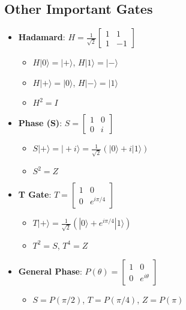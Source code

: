 \begin{multicols}{3}
    \section*{Other Important Gates}
    \begin{itemize}[leftmargin=*,nosep,topsep=0pt]
      \item \textbf{Hadamard}: $H = \frac{1}{\sqrt{2}}\begin{bmatrix} 1 & 1 \\ 1 & -1 \end{bmatrix}$
        \begin{itemize}[nosep]
          \item $H|0\rangle = |+\rangle$, $H|1\rangle = |-\rangle$
          \item $H|+\rangle = |0\rangle$, $H|-\rangle = |1\rangle$
          \item $H^2 = I$
        \end{itemize}
      \item \textbf{Phase (S)}: $S = \begin{bmatrix} 1 & 0 \\ 0 & i \end{bmatrix}$
        \begin{itemize}[nosep]
          \item $S|+\rangle = |+i\rangle = \frac{1}{\sqrt{2}}(|0\rangle + i|1\rangle)$
          \item $S^2 = Z$
        \end{itemize}
      \item \textbf{T Gate}: $T = \begin{bmatrix} 1 & 0 \\ 0 & e^{i\pi/4} \end{bmatrix}$
        \begin{itemize}[nosep]
          \item $T|+\rangle = \frac{1}{\sqrt{2}}(|0\rangle + e^{i\pi/4}|1\rangle)$
          \item $T^2 = S$, $T^4 = Z$
        \end{itemize}
      \item \textbf{General Phase}: $P(\theta) = \begin{bmatrix} 1 & 0 \\ 0 & e^{i\theta} \end{bmatrix}$
        \begin{itemize}[nosep]
          \item $S = P(\pi/2)$, $T = P(\pi/4)$, $Z = P(\pi)$
        \end{itemize}
    \end{itemize}


\end{multicols}
